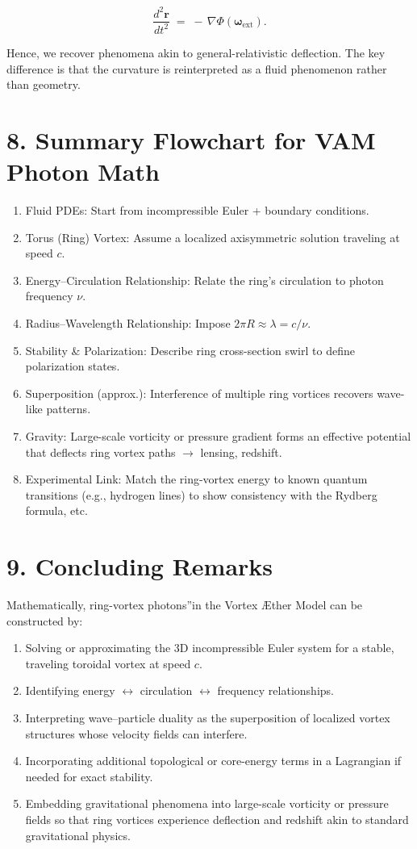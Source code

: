 \[
 \frac{d^2 \mathbf{r}}{dt^2} \;=\; -\,\nabla \Phi(\boldsymbol{\omega}_{\mathrm{ext}}).
\]

Hence, we recover phenomena akin to general-relativistic deflection. The key difference is that the curvature is reinterpreted as a fluid phenomenon rather than geometry.

\section*{8. Summary Flowchart for VAM Photon Math}
\begin{enumerate}
 \item Fluid PDEs: Start from incompressible Euler + boundary conditions.
 \item Torus (Ring) Vortex: Assume a localized axisymmetric solution traveling at speed \(c\).
 \item Energy–Circulation Relationship: Relate the ring's circulation to photon frequency \(\nu\).
 \item Radius–Wavelength Relationship: Impose \(2\pi R \approx \lambda = c/\nu\).
 \item Stability \& Polarization: Describe ring cross-section swirl to define polarization states.
 \item Superposition (approx.): Interference of multiple ring vortices recovers wave-like patterns.
 \item Gravity: Large-scale vorticity or pressure gradient forms an effective potential that deflects ring vortex paths \(\rightarrow\) lensing, redshift.
 \item Experimental Link: Match the ring-vortex energy to known quantum transitions (e.g., hydrogen lines) to show consistency with the Rydberg formula, etc.
\end{enumerate}

\section*{9. Concluding Remarks}
Mathematically, ring-vortex \grqq photons\textquotedblright in the Vortex Æther Model can be constructed by:

\begin{enumerate}
 \item Solving or approximating the 3D incompressible Euler system for a stable, traveling toroidal vortex at speed \(c\).
 \item Identifying energy \(\leftrightarrow\) circulation \(\leftrightarrow\) frequency relationships.
 \item Interpreting wave–particle duality as the superposition of localized vortex structures whose velocity fields can interfere.
 \item Incorporating additional topological or core-energy terms in a Lagrangian if needed for exact stability.
 \item Embedding gravitational phenomena into large-scale vorticity or pressure fields so that ring vortices experience deflection and redshift akin to standard gravitational physics.
\end{enumerate}

